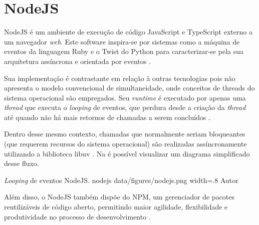 \section{NodeJS}
\label{sec:nodejs}
NodeJS é um ambiente de execução de código JavaScript e TypeScript externo a um navegador \textit{web}. Este software inspira-se por sistemas como a máquina de eventos da linguagem Ruby e o Twist do Python para caracterizar-se pela sua arquitetura assíncrona e orientada por eventos \cite{Foundation2023}. 

Sua implementação é contrastante em relação à outras tecnologias pois não apresenta o modelo convencional de simultaneidade, onde conceitos de threads do sistema operacional são empregados.  Seu \textit{runtime} é executado por apenas uma \textit{thread} que executa o \textit{looping} de eventos, que perdura desde a criação da \textit{thread} até quando não há mais retornos de chamadas a serem concluídos \cite{Foundation2023}.

Dentro desse mesmo contexto, chamadas que normalmente seriam bloqueantes (que requerem recursos do sistema operacional) são realizadas assíncronamente utilizando a biblioteca libuv \cite{ClaudioWunder}. Na  é possível visualizar um diagrama simplificado desse fluxo.

\image
    {\textit{Looping} de eventos NodeJS.}
    {nodejs}
    {data/figures/nodejs.png}
    {width=.8\textwidth}
    {Autor}

Além disso, o NodeJS também dispõe do NPM, um gerenciador de pacotes reutilizáveis de código aberto, permitindo maior agilidade, flexibilidade e produtividade no processo de desenvolvimento \cite{npm2022}.